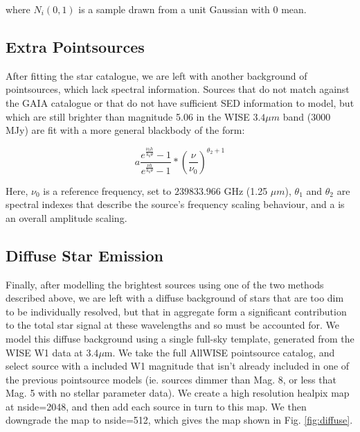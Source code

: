 \documentclass{aa}
\begin{document}
where $N_i(0,1)$ is a sample drawn from a unit Gaussian with 0 mean.

\subsection{Extra Pointsources}

\label{sec:extragalacticmodel}

After fitting the star catalogue, we are left with another background of pointsources, which lack spectral information. Sources that do not match against the GAIA catalogue or that do not have sufficient SED information to model, but which are still brighter than magnitude 5.06 in the WISE $3.4 \mu m$ band ($3000$ MJy) are fit with a more general blackbody of the form:

\begin{equation}
a \frac{e^{\frac{\nu_0 h}{k_b \theta}} - 1}{e^{\frac{\nu h}{k_b \theta}} - 1} * (\frac{\nu}{\nu_0})^{\theta_2 + 1}
\end{equation}

Here, $\nu_0$ is a reference frequency, set to $239833.966$ GHz (1.25 $\mu m$), $\theta_1$ and $\theta_2$ are spectral indexes that describe the source's frequency scaling behaviour, and a is an overall amplitude scaling. 



\subsection{Diffuse Star Emission}

\label{sec:diffusemodel}

Finally, after modelling the brightest sources using one of the two methods described above, we are left with a diffuse background of stars that are too dim to be individually resolved, but that in aggregate form a significant contribution to the total star signal at these wavelengths and so must be accounted for. We model this diffuse background using a single full-sky template, generated from the WISE W1 data at 3.4$\mu$m. We take the full AllWISE pointsource catalog, and select source with a included W1 magnitude that isn't already included in one of the previous pointsource models (ie. sources dimmer than Mag. 8, or less that Mag. 5 with no stellar parameter data). We create a high resolution healpix map \citep{healpix} at nside=2048, and then add each source in turn to this map. We then downgrade the map to nside=512, which gives the map shown in Fig. \ref{fig:diffuse}. 
\end{document}
